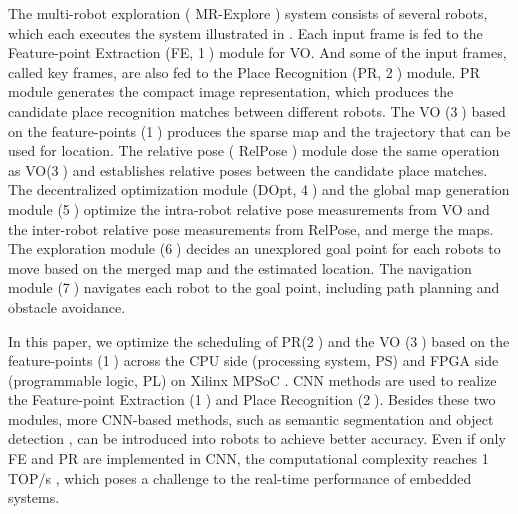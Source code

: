 
The multi-robot exploration ( MR-Explore ) system \cite{corah2019communication, cieslewski2018data} consists of several robots, which each executes the system illustrated in . Each input frame is fed to the Feature-point Extraction (FE, \textcircled{1}) module for VO. 
And some of the input frames, called key frames, are also fed to the Place Recognition (PR, \textcircled{2}) module.
PR module generates the compact image representation, which produces the candidate place recognition matches between different robots. The VO (\textcircled{3}) based on the feature-points (\textcircled{1}) produces the sparse map and the trajectory that can be used for location. The relative pose ( RelPose ) module dose the same operation as VO(\textcircled{3}) and establishes relative poses between the candidate place matches. The decentralized optimization module (DOpt, \textcircled{4}) and the global map generation module (\textcircled{5}) optimize the  intra-robot relative pose measurements from VO and the inter-robot relative pose measurements from RelPose, and merge the maps. The exploration module (\textcircled{6}) decides an unexplored goal point for each robots to move based on the merged map and the estimated location. The navigation module (\textcircled{7}) navigates each robot to the goal point, including path planning and obstacle avoidance.

In this paper, we optimize the scheduling of PR(\textcircled{2}) and the VO (\textcircled{3}) based on the feature-points (\textcircled{1}) across the CPU side (processing system, PS) and FPGA side (programmable logic, PL) on Xilinx MPSoC \cite{MPSoC}. CNN methods are used to realize the Feature-point Extraction (\textcircled{1}) and  Place Recognition (\textcircled{2}). 
Besides these two modules, more CNN-based methods, such as semantic segmentation \cite{long2015fully} and object detection \cite{ren2015faster}, can be introduced into robots to achieve better accuracy.
Even if only FE and PR are implemented in CNN, the computational complexity reaches 1 TOP/s , which poses a challenge to the real-time performance of embedded systems.


